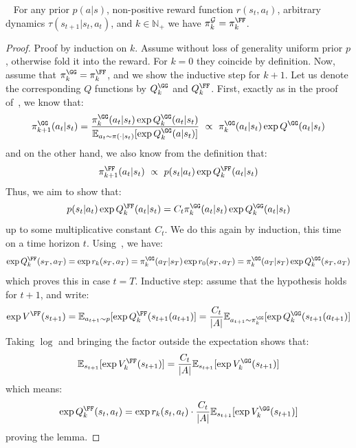 \begin{lemma}~\label{lemma:equivalence-folding-retraining}
    For any prior $p(a|s)$, non-positive reward function $r(s_t,a_t)$, arbitrary dynamics $\tau(s_{t+1}|s_t, a_t)$, and $k \in \mathbb{N}_+$ we have $\pi^\mathcal{G}_{k} = \pi^\FF_k$.
\end{lemma}
\begin{proof}
Proof by induction on $k$. Assume without loss of generality uniform prior $p$, otherwise fold it into the reward. For $k=0$ they coincide by definition. Now, assume that $\pi_k^\GG = \pi_k^\FF$, and we show the inductive step for $k+1$. Let us denote the corresponding $Q$ functions by $Q^\GG_k$ and $Q^\FF_k$.
First, exactly as in the proof of~, we know that:
\[
        \pi_{k+1}^\GG(a_t|s_t) = \frac{\pi_{k}^\GG(a_t|s_t) \exp Q^{\GG}_k(a_t|s_t)}{\mathbb{E}_{a_t \sim \pi(\cdot|s_t)}[\exp Q^{\GG}_k(a|s_t)]}\ \propto\ \pi_{k}^\GG(a_t|s_t) \exp Q^{\GG}(a_t|s_t)
\]
and on the other hand, we also know from the definition that:
\[
    \pi_{k+1}^\FF(a_t|s_t) \ \propto \ p(s_t|a_t) \exp Q^{\FF}_k(a_t|s_t)
\]
Thus, we aim to show that: \[
p(s_t|a_t) \exp Q^{\FF}_k(a_t|s_t) = C_t\pi_{k}^\GG(a_t|s_t) \exp Q^{\GG}_k(a_t|s_t)
\]
up to some multiplicative constant $C_t$. We do this again by induction, this time on a time horizon $t$.
Using~, we have:
\[
  \exp Q^{\FF}_k(s_T,a_T)=\exp r_k(s_T,a_T)
  =\pi^\GG_k(a_T| s_T)\exp r_0(s_T,a_T)
  =\pi^\GG_k(a_T| s_T)\exp Q^{\GG}_k(s_T,a_T)
\]
which proves this in case $t=T$. Inductive step: assume that the hypothesis holds for $t+1$, and write:
\[
\exp V^\FF(s_{t+1})
=\mathbb{E}_{a_{t+1}\sim p}[\exp Q^{\FF}_k(s_{t+1}(a_{t+1})]
=\frac{C_t}{|A|}\mathbb{E}_{a_{t+1}\sim \pi^\GG_k}[\exp Q^\GG_k(s_{t+1}(a_{t+1})]
\]
Taking $\log$ and bringing the factor outside the expectation shows that:
 \[
  \mathbb{E}_{s_{t+1}}[\exp V^\FF_k(s_{t+1})]
  =\frac{C_t}{|A|}\mathbb{E}_{s_{t+1}}[\exp V^\GG_k(s_{t+1})]
\]
which means:
\[
\exp Q^\FF_k(s_t,a_t)
  =\exp r_k(s_t,a_t)\cdot \frac{C_t}{|A|}
  \mathbb{E}_{s_{t+1}}[\exp V^\GG_k(s_{t+1})]
\]
proving the lemma.
\end{proof}


